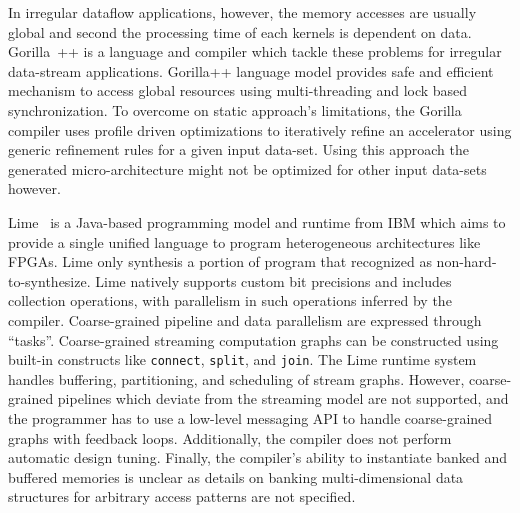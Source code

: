 In irregular dataflow applications, however, the memory accesses are usually global and second the processing time of each kernels is dependent on data. 
Gorilla~\cite{lavasani_thesis}++ is a language and compiler which tackle these problems for irregular  data-stream applications.
Gorilla++ language model provides safe and efficient mechanism to access global resources using multi-threading and lock based synchronization.
To overcome on static approach's limitations, the Gorilla compiler uses profile driven optimizations to iteratively refine an accelerator using generic refinement rules for a given input data-set.
Using this approach the generated micro-architecture might not be optimized for other input data-sets however.

Lime~\cite{lime} is a Java-based programming model and runtime from IBM which aims to provide a single unified language to program heterogeneous architectures like FPGAs.
Lime only synthesis a portion of program that recognized as non-hard-to-synthesize.
Lime natively supports custom bit precisions and includes collection operations, with parallelism in such operations inferred by the compiler.
Coarse-grained pipeline and data parallelism are expressed through ``tasks''.
Coarse-grained streaming computation graphs can be constructed using built-in constructs like \texttt{\small{connect}}, \texttt{\small{split}}, and \texttt{\small{join}}.
The Lime runtime system handles buffering, partitioning, and scheduling of stream graphs.
However, coarse-grained pipelines which deviate from the streaming model are not supported, and the programmer has to use a low-level messaging API to handle coarse-grained graphs with feedback loops.
Additionally, the compiler does not perform automatic design tuning.
Finally, the compiler's ability to instantiate banked and buffered memories is unclear as details on banking multi-dimensional data structures for arbitrary access patterns are not specified.



%

%

